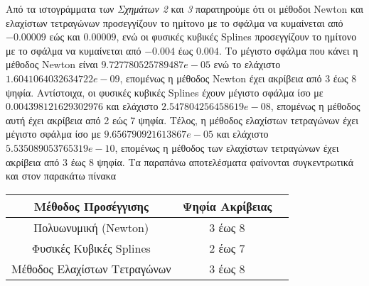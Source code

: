 \documentclass[Second Project.tex]{subfiles}
\begin{document}
Από τα ιστογράμματα των \textit{Σχημάτων 2} και \textit{3} παρατηρούμε ότι οι μέθοδοι \textlatin{Newton} 
και ελαχίστων τετραγώνων προσεγγίζουν το ημίτονο με το σφάλμα να κυμαίνεται από $-0.00009$ εώς και $0.00009$, ενώ οι
φυσικές κυβικές \textlatin{Splines} προσεγγίζουν το ημίτονο με το σφάλμα να κυμαίνεται από $-0.004$ έως $0.004$.
Το μέγιστο σφάλμα που κάνει η μέθοδος \textlatin{Newton} είναι $9.727780525789487e-05$ ενώ το ελάχιστο
$1.6041064032634722e-09$, επομένως η μέθοδος \textlatin{Newton} έχει ακρίβεια από 3 έως 8 ψηφία. Αντίστοιχα, οι 
φυσικές κυβικές \textlatin{Splines} έχουν μέγιστο σφάλμα ίσο με $0.004398121629302976$ και ελάχιστο 
$2.547804256458619e-08$, επομένως η μέθοδος αυτή έχει ακρίβεια από 2 εώς 7 ψηφία. Τέλος, η μέθοδος ελαχίστων
τετραγώνων έχει μέγιστο σφάλμα ίσο με $9.656790921613867e-05$ και ελάχιστο $5.535089053765319e-10$, επομένως η
μέθοδος των ελαχίστων τετραγώνων έχει ακρίβεια από 3 έως 8 ψηφία. Τα παραπάνω αποτελέσματα φαίνονται συγκεντρωτικά 
και στον παρακάτω πίνακα 
\begin{center}
    \begin{tabular}{ |c|c|c| } 
     \hline
     Μέθοδος Προσέγγισης & Ψηφία Ακρίβειας \\
     \hline
     Πολυωνυμική (\textlatin{Newton}) & 3 έως 8 \\
     \hline
     Φυσικές Κυβικές \textlatin{Splines} & 2 έως 7 \\ 
     \hline
     Μέθοδος Ελαχίστων Τετραγώνων & 3 έως 8 \\
     \hline
    \end{tabular}
\end{center}
\newpage
\end{document}
